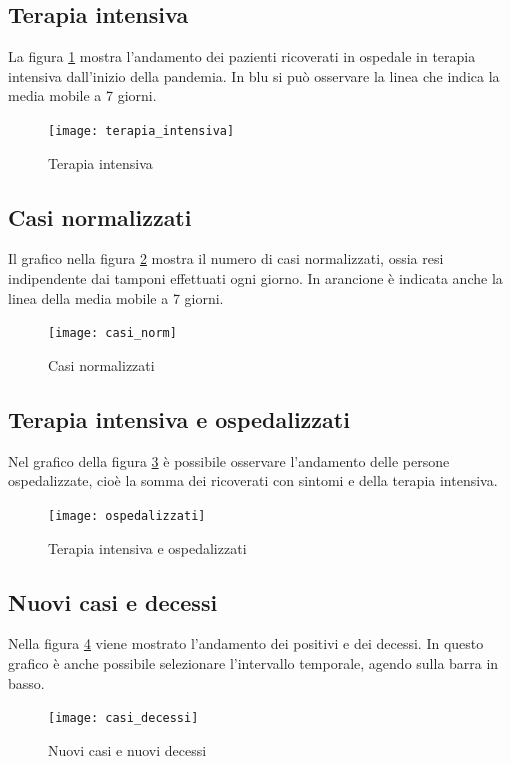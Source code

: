 \subsection{Terapia intensiva}
La figura \ref{fig:terapia_intensiva} mostra l'andamento dei pazienti ricoverati in ospedale in terapia intensiva dall'inizio della pandemia.
In blu si può osservare la linea che indica la media mobile a 7 giorni.
\begin{figure}[htp]
    \centering
    \texttt{[image: terapia\_intensiva]}
    \caption{Terapia intensiva}
    \label{fig:terapia_intensiva}
\end{figure}

\subsection{Casi normalizzati}
Il grafico nella figura \ref{fig:casi_normalizzati} mostra il numero di casi normalizzati, ossia resi indipendente dai tamponi effettuati ogni giorno.
In arancione è indicata anche la linea della media mobile a 7 giorni.
\begin{figure}[htp]
    \centering
    \texttt{[image: casi\_norm]}
    \caption{Casi normalizzati}
    \label{fig:casi_normalizzati}
\end{figure}

\subsection{Terapia intensiva e ospedalizzati}
Nel grafico della figura \ref{fig:ti_ospdedalizzati} è possibile osservare l'andamento delle persone ospedalizzate, cioè la somma dei ricoverati con sintomi e della terapia intensiva.
\begin{figure}[htp]
    \centering
    \texttt{[image: ospedalizzati]}
    \caption{Terapia intensiva e ospedalizzati}
    \label{fig:ti_ospdedalizzati}
\end{figure}


\subsection{Nuovi casi e decessi}
Nella figura \ref{fig:casi_decessi} viene mostrato l'andamento dei positivi e dei decessi.
In questo grafico è anche possibile selezionare l'intervallo temporale, agendo sulla barra in basso.
\begin{figure}[htp]
    \centering
    \texttt{[image: casi\_decessi]}
    \caption{Nuovi casi e nuovi decessi}
    \label{fig:casi_decessi}
\end{figure}

